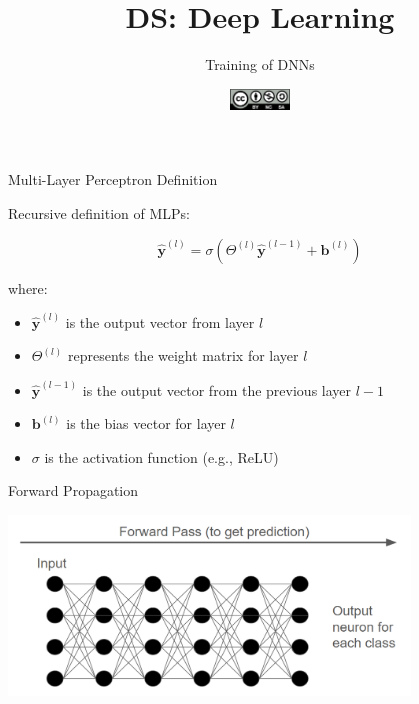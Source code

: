 \documentclass[aspectratio=169]{../latex_main/tntbeamer}  %
\title[DL: Training of DNNs]{DS: Deep Learning}
\subtitle{Training of DNNs}
\date{\hspace{0.5em} {\includegraphics[height=1.5em]{../latex_main/figures/Cc-by-nc-sa_icon.svg.png}}}
\begin{document}
	
	\maketitle
	\begin{frame}{Multi-Layer Perceptron Definition}

        Recursive definition of MLPs:

            \[
            \hat{\textbf{y}}^{(l)} = \sigma({\Theta}^{(l)} \hat{\textbf{y}}^{(l-1)} + \textbf{b}^{(l)})
            \]
            
            where:
            \begin{itemize}
                \item \( \hat{\textbf{y}}^{(l)} \) is the output vector from layer \( l \)
                \item \( \Theta^{(l)} \) represents the weight matrix for layer \( l \)
                \item \( \hat{\textbf{y}}^{(l-1)} \) is the output vector from the previous layer \( l-1 \)
                \item \( \textbf{b}^{(l)} \) is the bias vector for layer \( l \)
                \item \( \sigma \) is the activation function (e.g., ReLU)
            \end{itemize}
                
	\end{frame}


  	\begin{frame}{Forward Propagation}

        \includegraphics[width=0.8\textwidth]{figure/forward.png}

        \end{frame}
\end{document}
